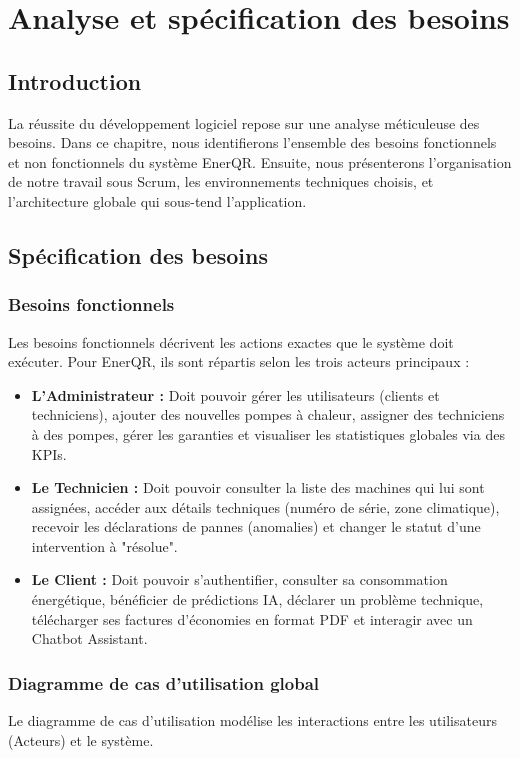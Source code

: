 \documentclass[12pt,a4paper]{report}
\begin{document}
\chapter{Analyse et spécification des besoins}

\section*{Introduction}
La réussite du développement logiciel repose sur une analyse méticuleuse des besoins. Dans ce chapitre, nous identifierons l'ensemble des besoins fonctionnels et non fonctionnels du système EnerQR. Ensuite, nous présenterons l'organisation de notre travail sous Scrum, les environnements techniques choisis, et l'architecture globale qui sous-tend l'application.

\section{Spécification des besoins}
\subsection{Besoins fonctionnels}
Les besoins fonctionnels décrivent les actions exactes que le système doit exécuter. Pour EnerQR, ils sont répartis selon les trois acteurs principaux :
\begin{itemize}
    \item \textbf{L'Administrateur :} Doit pouvoir gérer les utilisateurs (clients et techniciens), ajouter des nouvelles pompes à chaleur, assigner des techniciens à des pompes, gérer les garanties et visualiser les statistiques globales via des KPIs.
    \item \textbf{Le Technicien :} Doit pouvoir consulter la liste des machines qui lui sont assignées, accéder aux détails techniques (numéro de série, zone climatique), recevoir les déclarations de pannes (anomalies) et changer le statut d'une intervention à "résolue".
    \item \textbf{Le Client :} Doit pouvoir s'authentifier, consulter sa consommation énergétique, bénéficier de prédictions IA, déclarer un problème technique, télécharger ses factures d'économies en format PDF et interagir avec un Chatbot Assistant.
\end{itemize}

\subsection{Diagramme de cas d'utilisation global}
Le diagramme de cas d'utilisation modélise les interactions entre les utilisateurs (Acteurs) et le système.
\end{document}
